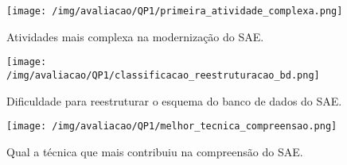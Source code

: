 \begin{figure}[htb]
\centering
\texttt{[image: /img/avaliacao/QP1/primeira\_atividade\_complexa.png]}
\caption{Atividades mais complexa na modernização do \acrshort{SAE}.}
\label{fig:primeira_atividade_complexa}
\end{figure}



\begin{figure}[htb]
\centering
\texttt{[image: /img/avaliacao/QP1/classificacao\_reestruturacao\_bd.png]}
\caption{Dificuldade para reestruturar o esquema do banco de dados do \acrshort{SAE}.}
\label{fig:classificacao_reestruturacao_bd}
\end{figure}



\begin{figure}[htb]
\centering
\texttt{[image: /img/avaliacao/QP1/melhor\_tecnica\_compreensao.png]}
\caption{Qual a técnica que mais contribuiu na compreensão do \acrshort{SAE}.}
\label{fig:melhor_tecnica_compreensao}
\end{figure}




